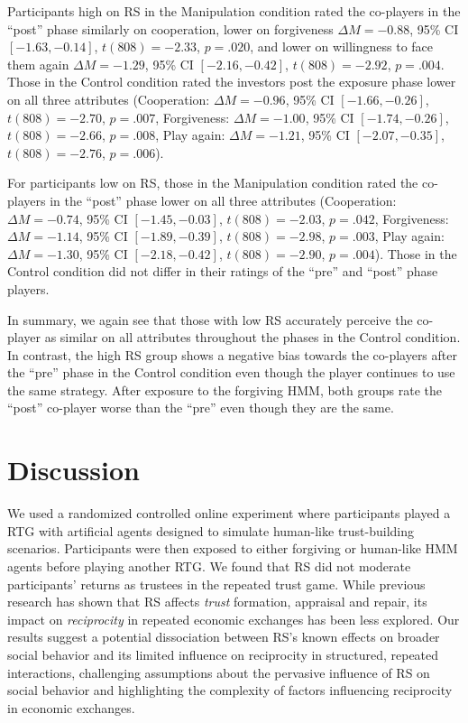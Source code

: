 \documentclass[
]{article}
\begin{document}
Participants high on RS in the Manipulation condition rated the
co-players in the ``post'' phase similarly on cooperation, lower on
forgiveness
\(\Delta M = -0.88\), 95\% CI \([-1.63, -0.14]\), \(t(808) = -2.33\), \(p = .020\),
and lower on willingness to face them again
\(\Delta M = -1.29\), 95\% CI \([-2.16, -0.42]\), \(t(808) = -2.92\), \(p = .004\).
Those in the Control condition rated the investors post the exposure
phase lower on all three attributes (Cooperation:
\(\Delta M = -0.96\), 95\% CI \([-1.66, -0.26]\), \(t(808) = -2.70\), \(p = .007\),
Forgiveness:
\(\Delta M = -1.00\), 95\% CI \([-1.74, -0.26]\), \(t(808) = -2.66\), \(p = .008\),
Play again:
\(\Delta M = -1.21\), 95\% CI \([-2.07, -0.35]\), \(t(808) = -2.76\), \(p = .006\)).

For participants low on RS, those in the Manipulation condition rated
the co-players in the ``post'' phase lower on all three attributes
(Cooperation:\(\Delta M = -0.74\), 95\% CI \([-1.45, -0.03]\), \(t(808) = -2.03\), \(p = .042\),
Forgiveness:
\(\Delta M = -1.14\), 95\% CI \([-1.89, -0.39]\), \(t(808) = -2.98\), \(p = .003\),
Play again:
\(\Delta M = -1.30\), 95\% CI \([-2.18, -0.42]\), \(t(808) = -2.90\), \(p = .004\)).
Those in the Control condition did not differ in their ratings of the
``pre'' and ``post'' phase players.

In summary, we again see that those with low RS accurately perceive the
co-player as similar on all attributes throughout the phases in the
Control condition. In contrast, the high RS group shows a negative bias
towards the co-players after the ``pre'' phase in the Control condition
even though the player continues to use the same strategy. After
exposure to the forgiving HMM, both groups rate the ``post'' co-player
worse than the ``pre'' even though they are the same.

\section{Discussion}\label{discussion}

We used a randomized controlled online experiment where participants
played a RTG with artificial agents designed to simulate human-like
trust-building scenarios. Participants were then exposed to either
forgiving or human-like HMM agents before playing another RTG. We found
that RS did not moderate participants' returns as trustees in the
repeated trust game. While previous research has shown that RS affects
\emph{trust} formation, appraisal and repair, its impact on \emph{reciprocity} in
repeated economic exchanges has been less explored. Our results suggest
a potential dissociation between RS's known effects on broader social
behavior and its limited influence on reciprocity in structured,
repeated interactions, challenging assumptions about the pervasive
influence of RS on social behavior and highlighting the complexity of
factors influencing reciprocity in economic exchanges.
\end{document}

